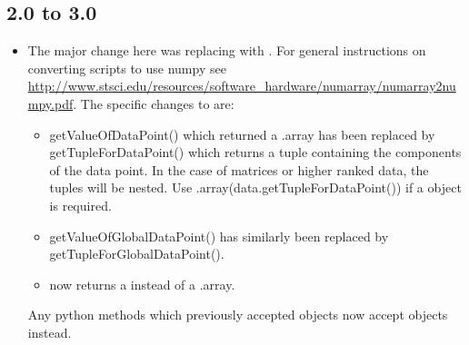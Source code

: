 \subsection*{2.0 to 3.0}
\begin{itemize}
\item The major change here was replacing  with \numpy.
For general instructions on converting scripts to use numpy see \url{http://www.stsci.edu/resources/software_hardware/numarray/numarray2numpy.pdf}.
The specific changes to \escript are:
 \begin{itemize}
  \item getValueOfDataPoint() which returned a .array has been
      replaced by getTupleForDataPoint() which returns a \PYTHON tuple
      containing the components of the data point. In the case of matrices or
      higher ranked data, the tuples will be nested.
      Use \numpy.array(data.getTupleForDataPoint()) if a \numpyNDA object is
      required.
  \item getValueOfGlobalDataPoint() has similarly been replaced by
      getTupleForGlobalDataPoint().
  \item {} now returns a \numpyNDA instead of a
      .array.
 \end{itemize}
Any python methods which previously accepted  objects now
accept \numpy objects instead.


\end{itemize}
